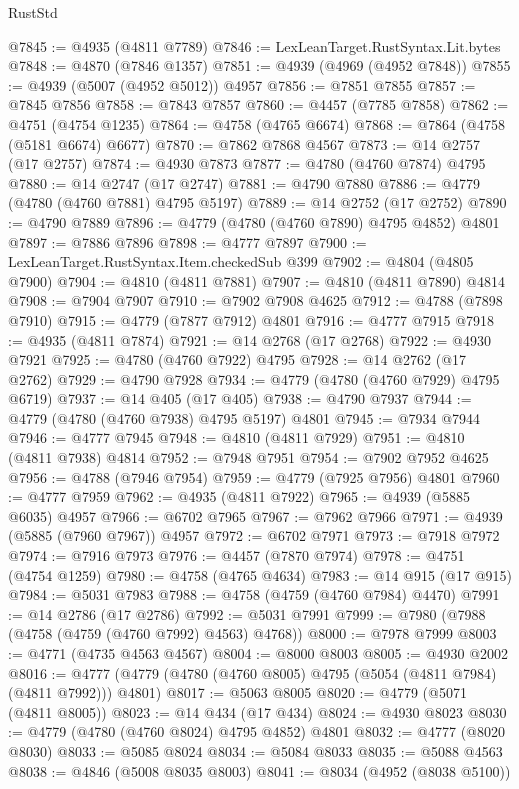 \begin{lexlean}{RustStd}
\begin{coremodule}
@7845 := @4935 (@4811 @7789)
@7846 := LexLeanTarget.RustSyntax.Lit.bytes
@7848 := @4870 (@7846 @1357)
@7851 := @4939 (@4969 (@4952 @7848))
@7855 := @4939 (@5007 (@4952 @5012)) @4957
@7856 := @7851 @7855
@7857 := @7845 @7856
@7858 := @7843 @7857
@7860 := @4457 (@7785 @7858)
@7862 := @4751 (@4754 @1235)
@7864 := @4758 (@4765 @6674)
@7868 := @7864 (@4758 (@5181 @6674) @6677)
@7870 := @7862 @7868 @4567
@7873 := @14 @2757 (@17 @2757)
@7874 := @4930 @7873
@7877 := @4780 (@4760 @7874) @4795
@7880 := @14 @2747 (@17 @2747)
@7881 := @4790 @7880
@7886 := @4779 (@4780 (@4760 @7881) @4795 @5197)
@7889 := @14 @2752 (@17 @2752)
@7890 := @4790 @7889
@7896 := @4779 (@4780 (@4760 @7890) @4795 @4852) @4801
@7897 := @7886 @7896
@7898 := @4777 @7897
@7900 := LexLeanTarget.RustSyntax.Item.checkedSub @399
@7902 := @4804 (@4805 @7900)
@7904 := @4810 (@4811 @7881)
@7907 := @4810 (@4811 @7890) @4814
@7908 := @7904 @7907
@7910 := @7902 @7908 @4625
@7912 := @4788 (@7898 @7910)
@7915 := @4779 (@7877 @7912) @4801
@7916 := @4777 @7915
@7918 := @4935 (@4811 @7874)
@7921 := @14 @2768 (@17 @2768)
@7922 := @4930 @7921
@7925 := @4780 (@4760 @7922) @4795
@7928 := @14 @2762 (@17 @2762)
@7929 := @4790 @7928
@7934 := @4779 (@4780 (@4760 @7929) @4795 @6719)
@7937 := @14 @405 (@17 @405)
@7938 := @4790 @7937
@7944 := @4779 (@4780 (@4760 @7938) @4795 @5197) @4801
@7945 := @7934 @7944
@7946 := @4777 @7945
@7948 := @4810 (@4811 @7929)
@7951 := @4810 (@4811 @7938) @4814
@7952 := @7948 @7951
@7954 := @7902 @7952 @4625
@7956 := @4788 (@7946 @7954)
@7959 := @4779 (@7925 @7956) @4801
@7960 := @4777 @7959
@7962 := @4935 (@4811 @7922)
@7965 := @4939 (@5885 @6035) @4957
@7966 := @6702 @7965
@7967 := @7962 @7966
@7971 := @4939 (@5885 (@7960 @7967)) @4957
@7972 := @6702 @7971
@7973 := @7918 @7972
@7974 := @7916 @7973
@7976 := @4457 (@7870 @7974)
@7978 := @4751 (@4754 @1259)
@7980 := @4758 (@4765 @4634)
@7983 := @14 @915 (@17 @915)
@7984 := @5031 @7983
@7988 := @4758 (@4759 (@4760 @7984) @4470)
@7991 := @14 @2786 (@17 @2786)
@7992 := @5031 @7991
@7999 := @7980 (@7988 (@4758 (@4759 (@4760 @7992) @4563) @4768))
@8000 := @7978 @7999
@8003 := @4771 (@4735 @4563 @4567)
@8004 := @8000 @8003
@8005 := @4930 @2002
@8016 := @4777 (@4779 (@4780 (@4760 @8005) @4795 (@5054 (@4811 @7984) (@4811 @7992))) @4801)
@8017 := @5063 @8005
@8020 := @4779 (@5071 (@4811 @8005))
@8023 := @14 @434 (@17 @434)
@8024 := @4930 @8023
@8030 := @4779 (@4780 (@4760 @8024) @4795 @4852) @4801
@8032 := @4777 (@8020 @8030)
@8033 := @5085 @8024
@8034 := @5084 @8033
@8035 := @5088 @4563
@8038 := @4846 (@5008 @8035 @8003)
@8041 := @8034 (@4952 (@8038 @5100))

\end{coremodule}
\end{lexlean}
